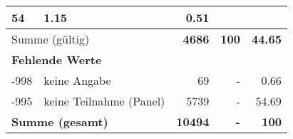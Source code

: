 \begin{longtable}{lXrrr}
       \num{54} &
       \num[round-mode=places,round-precision=2]{1,15} &
         \num[round-mode=places,round-precision=2]{0,51} \\
     \midrule
     \multicolumn{2}{l}{Summe (gültig)} &
       \textbf{\num{4686}} &
     \textbf{100} &
       \textbf{\num[round-mode=places,round-precision=2]{44,65}} \\
     \multicolumn{5}{l}{\textbf{Fehlende Werte}}\\
       -998 &
       keine Angabe &
         \num{69} &
        - &
         \num[round-mode=places,round-precision=2]{0,66} \\
       -995 &
       keine Teilnahme (Panel) &
         \num{5739} &
        - &
         \num[round-mode=places,round-precision=2]{54,69} \\
     \midrule
     \multicolumn{2}{l}{\textbf{Summe (gesamt)}} &
          \textbf{\num{10494}} &
        \textbf{-} &
        \textbf{100} \\
     \bottomrule
     \end{longtable}
     
